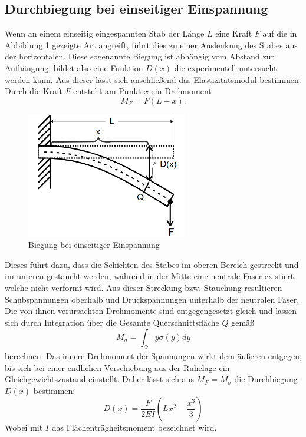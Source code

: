 \subsection{Durchbiegung bei einseitiger Einspannung}
Wenn an einem einseitig eingespannten Stab der Länge $L$ eine Kraft $F$ auf die in Abbildung \ref{fig:einseitig} gezeigte Art angreift, führt dies zu einer Auslenkung des Stabes
aus der horizontalen. Diese sogenannte Biegung ist abhängig vom Abstand zur Aufhängung, bildet also eine Funktion $D(x)$ die experimentell untersucht werden kann. 
Aus dieser lässt sich anschließend das Elastizitätsmodul bestimmen. Durch die Kraft $F$ entsteht am Punkt $x$ ein Drehmoment 
\begin{equation*}
M_F=F(L-x).
\end{equation*}
\begin{figure}
\centering
\includegraphics[width=7cm, keepaspectratio]{Biegung einseitig}
\caption{Biegung bei einseitiger Einspannung}
\label{fig:einseitig}
\end{figure}
Dieses führt dazu, dass die Schichten des Stabes im oberen Bereich gestreckt und im unteren gestaucht werden, während in der Mitte eine neutrale Faser existiert,
welche nicht verformt wird. Aus dieser Streckung bzw. Stauchung resultieren Schubspannungen oberhalb und Druckspannungen unterhalb der neutralen Faser.
Die von ihnen verursachten Drehmomente sind entgegengesetzt gleich und lassen sich durch Integration über die Gesamte Querschnittsfläche $Q$ gemäß
\begin{equation*}
M_{\sigma}=\int_{Q} y\sigma (y) dy
\end{equation*}
berechnen. Das innere Drehmoment der Spannungen wirkt dem äußeren entgegen, bis sich bei einer endlichen Verschiebung aus der Ruhelage ein Gleichgewichtszustand einstellt. Daher lässt sich aus $M_F=M_{\sigma}$ die Durchbiegung 
$D(x)$ bestimmen:
\begin{equation}
D(x)=\frac{F}{2EI}(Lx^2-\frac{x^3}{3})
\end{equation}
Wobei mit $I$ das Flächenträgheitsmoment bezeichnet wird. \\

